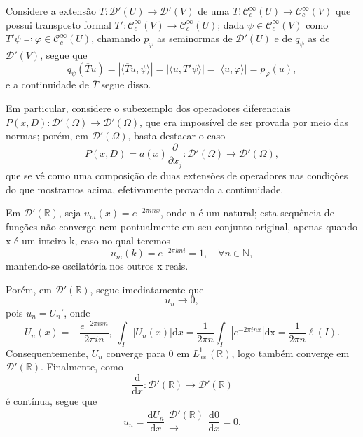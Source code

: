 \documentclass[../distribution_theory_notes.tex]{subfiles}
\begin{document}
\begin{example}
	Considere a extensão \(\overline{T}:\mathcal{D}'(U)\rightarrow \mathcal{D}'(V)\) de uma \(T:\mathcal{C}_{c}^{\infty}(U)\rightarrow \mathcal{C}_{c}^{\infty}(V)\) que possui transposto formal \(T':\mathcal{C}_{c}^{\infty}(V)\rightarrow \mathcal{C}_{c}^{\infty}(U) \); dada \(\psi \in \mathcal{C}_{c}^{\infty}(V)\) como \(T'\psi \eqqcolon \varphi \in \mathcal{C}_{c}^{\infty}(U)\), chamando \(p_{\varphi }\) as seminormas de \(\mathcal{D}'(U)\) e de \(q_{\psi }\) as de \(\mathcal{D}'(V)\), segue que
	\[
		q_{\psi}(\overline{T}u) = | \langle \overline{T}u, \psi  \rangle | = | \langle u, T'\psi \rangle | = | \langle u, \varphi  \rangle | = p_{\varphi }(u),
	\]
	e a continuidade de \(\overline{T}\) segue disso.

	Em particular, considere o subexemplo dos operadores diferenciais \(P(x, D):\mathcal{D}'(\Omega )\rightarrow \mathcal{D}'(\Omega ) \), que era impossível de ser provada por meio das normas; porém, em \(\mathcal{D}'(\Omega )\), basta destacar o caso
	\[
		P(x, D) = a(x) \frac{\partial^{}}{\partial x_{j}^{}}:\mathcal{D}'(\Omega )\rightarrow \mathcal{D}'(\Omega ),
	\]
	que se vê como uma composição de duas extensões de operadores nas condições do que mostramos acima, efetivamente provando a continuidade.
\end{example}
\begin{example}
	Em \(\mathcal{D}'(\mathbb{R})\), seja \(u_{m}(x) = e^{-2\pi i nx}\), onde n é um natural; esta sequência de funções não converge nem pontualmente em seu conjunto original, apenas quando x é um inteiro k, caso no qual teremos
	\[
		u_{m}(k) = e^{-2\pi kni} = 1,\quad \forall n\in \mathbb{N},
	\]
	mantendo-se oscilatória nos outros x reais.

	Porém, em \(\mathcal{D}'(\mathbb{R})\), segue imediatamente que
	\[
		u_{n}\to 0,
	\]
	pois \(u_{n} = U_{n}'\), onde
	\[
		U_{n}(x) = -\frac{e^{-2\pi ixn}}{2\pi in},\; \int_{I}^{}| U_{n}(x) | \mathrm{d}x = \frac{1}{2\pi n}\int_{I}^{}| e^{-2\pi inx} | \mathrm{dx} = \frac{1}{2\pi n}\ell (I).
	\]
	Consequentemente, \(U_{n}\) converge para 0 em \(L_{\mathrm{loc}}^{1}(\mathbb{R})\), logo também converge em \(\mathcal{D}'(\mathbb{R}).\) Finalmente, como
	\[
		\frac{\mathrm{d}}{\mathrm{d}x}: \mathcal{D}'(\mathbb{R})\rightarrow  \mathcal{D}'(\mathbb{R})
	\]
	é contínua, segue que
	\[
		u_{n} = \frac{\mathrm{d} U_{n}}{\mathrm{d}x}\substack{\mathcal{D}'(\mathbb{R}) \\ \longrightarrow \\ }\frac{\mathrm{d}0}{\mathrm{d}x} = 0.
	\]
\end{example}
\end{document}
